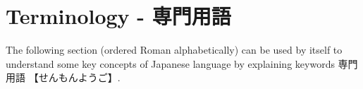 \chapter{Terminology - 専門用語}

The following section (ordered Roman alphabetically) can be used by itself to
understand some key concepts of Japanese language by explaining keywords
{専門用語} {【せんもんようご】}.


